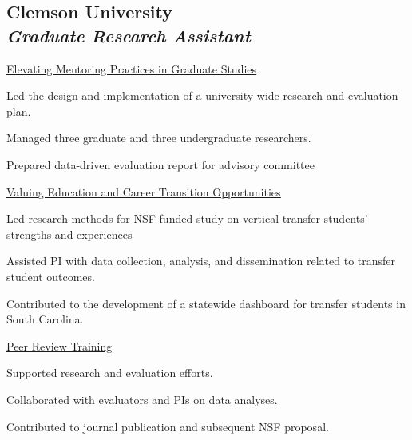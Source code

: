 
\subsection{\textbf{Clemson University} \\
\textit{Graduate Research Assistant}}
\begin{cvtable}
        {\color{cvsectioncolor}\href{https://www.nsf.gov/awardsearch/showAward?AWD_ID=2429719&HistoricalAwards=false}{\underline{Elevating Mentoring Practices in Graduate Studies}}}
        {}
        {\begin{tightitemize}
            \item Led the design and implementation of a university-wide research and evaluation plan.
            \item Managed three graduate and three undergraduate researchers.
            \item Prepared data-driven evaluation report for advisory committee
        \end{tightitemize}}
        {\color{cvsectioncolor}\href{https://www.nsf.gov/awardsearch/showAward?AWD_ID=2144213&HistoricalAwards=false}{\underline{Valuing Education and Career Transition Opportunities}}}
        {}
        {\begin{tightitemize}
            \item Led research methods for NSF-funded study on vertical transfer students' strengths and experiences
            \item Assisted PI with data collection, analysis, and dissemination related to transfer student outcomes.
            \item Contributed to the development of a statewide dashboard for transfer students in South Carolina.
        \end{tightitemize}}
        {\color{cvsectioncolor}\href{https://www.nsf.gov/awardsearch/showAward?AWD_ID=2037807&HistoricalAwards=false}{\underline{Peer Review Training}}}
        {}
        {\begin{tightitemize}
            \item Supported research and evaluation efforts.
            \item Collaborated with evaluators and PIs on data analyses.
            \item Contributed to journal publication and subsequent NSF proposal.
        \end{tightitemize}}
\end{cvtable}

